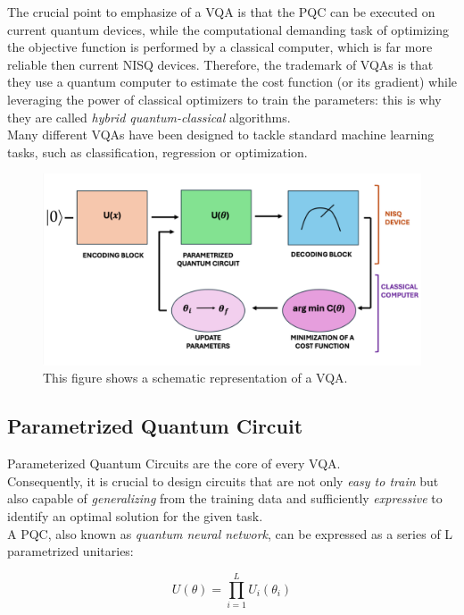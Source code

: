 The crucial point to emphasize of a VQA is that the PQC can be executed on current quantum
devices, while the computational demanding task of optimizing the objective function is
performed by a classical computer, which is far more reliable then current NISQ devices.
Therefore, the trademark of VQAs is that they use a quantum computer to estimate the cost function (or its gradient) 
while leveraging the power of classical optimizers to train the parameters: this is why they are called
\textit{hybrid quantum-classical} algorithms.\\
Many different VQAs have been designed to tackle standard machine learning tasks, such
as classification, regression or optimization.


\begin{figure}[h]
    \centering
    \includegraphics[scale=0.75]{sections/chapters/Quantum-Machine-Learning/Images/vqa.png}
    \caption{This figure shows a schematic representation of a VQA.}
    \label{fig:vqa-scheme}
\end{figure}

\subsection{Parametrized Quantum Circuit}

Parameterized Quantum Circuits are the core of every VQA.\\
Consequently, it is crucial to design circuits that are not only \textit{easy to train} but also capable of 
\textit{generalizing} from the training data and sufficiently \textit{expressive} to identify an optimal solution 
for the given task.\\

A PQC, also known as \textit{quantum neural network}, can be expressed as a series of L parametrized unitaries:

\begin{equation}
    U(\theta) = \prod_{i=1}^L U_i(\theta_i)
\label{Eq:definition-PQC}
\end{equation}

